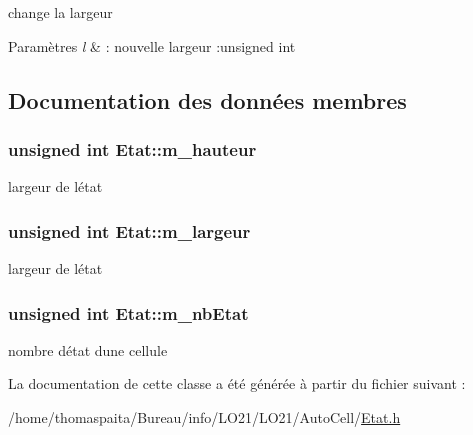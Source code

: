 change la largeur 


\begin{DoxyParams}{Paramètres}
{\em l} & \+: nouvelle largeur \+:unsigned int \\
\hline
\end{DoxyParams}


\subsection{Documentation des données membres}
\subsubsection[{\texorpdfstring{m\+\_\+hauteur}{m_hauteur}}]{\setlength{\rightskip}{0pt plus 5cm}unsigned int Etat\+::m\+\_\+hauteur\hspace{0.3cm}{\ttfamily [protected]}}\hypertarget{class_etat_a65a7ed3d0b46555af02677b2f37c8c9c}{}\label{class_etat_a65a7ed3d0b46555af02677b2f37c8c9c}
largeur de l\textquotesingle{}état 
\subsubsection[{\texorpdfstring{m\+\_\+largeur}{m_largeur}}]{\setlength{\rightskip}{0pt plus 5cm}unsigned int Etat\+::m\+\_\+largeur\hspace{0.3cm}{\ttfamily [protected]}}\hypertarget{class_etat_af575fb141b3c300c9cbb61337094ba1b}{}\label{class_etat_af575fb141b3c300c9cbb61337094ba1b}
largeur de l\textquotesingle{}état 
\subsubsection[{\texorpdfstring{m\+\_\+nb\+Etat}{m_nbEtat}}]{\setlength{\rightskip}{0pt plus 5cm}unsigned int Etat\+::m\+\_\+nb\+Etat\hspace{0.3cm}{\ttfamily [protected]}}\hypertarget{class_etat_a281d9e6224c108d5db463540bb2414f3}{}\label{class_etat_a281d9e6224c108d5db463540bb2414f3}
nombre d\textquotesingle{}état d\textquotesingle{}une cellule 

La documentation de cette classe a été générée à partir du fichier suivant \+:\begin{DoxyCompactItemize}
\item 
/home/thomaspaita/\+Bureau/info/\+L\+O21/\+L\+O21/\+Auto\+Cell/\hyperlink{_etat_8h}{Etat.\+h}\end{DoxyCompactItemize}
